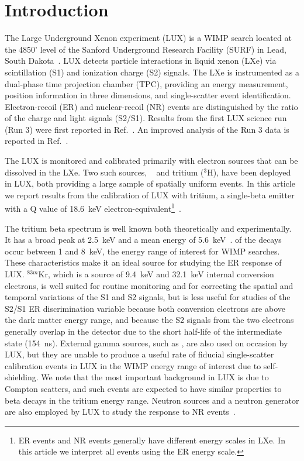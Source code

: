 \section{Introduction}

The Large Underground Xenon experiment (LUX) is a WIMP search located at the 4850' level of the Sanford Underground Research Facility (SURF) in Lead, South Dakota~\cite{lux-nim}. LUX detects particle interactions in liquid xenon (LXe) via scintillation (S1) and ionization charge (S2) signals. The LXe is instrumented as a dual-phase time projection chamber (TPC), providing an energy measurement, position information in three dimensions, and single-scatter event identification. Electron-recoil (ER) and nuclear-recoil (NR) events are distinguished by the ratio of the charge and light signals (S2/S1). Results from the first LUX science run (Run 3) were first reported in Ref.~\cite{lux-prl}. An improved analysis of the Run 3 data is reported in Ref.~\cite{lux-reanalysis}.

The LUX is monitored and calibrated primarily with electron sources that can be dissolved in the LXe. Two such sources,  \krsrc~\cite{Kastens:2009rt, Baudis} and tritium ($^{3}$H), have been deployed in LUX, both providing a large sample of spatially uniform events. In this article we report results from the calibration of LUX with tritium, a single-beta emitter with a Q value of 18.6~keV electron-equivalent\footnote{ER events and NR events generally have different energy scales in LXe. In this article we interpret all events using the ER energy scale.}~\cite{Tritium_Q}. 

The tritium beta spectrum is well known both theoretically and experimentally. It has a broad peak at 2.5~keV and a mean energy of 5.6~keV~\cite{Tritium_Mean,Tritium_Eq}.  of the decays occur between 1 and 8~keV, the energy range of interest for WIMP searches. These characteristics make it an ideal source for studying the ER response of LUX.  $^{83m}$Kr, which is a source of 9.4~keV and 32.1~keV internal conversion electrons, is well suited for routine monitoring and for correcting the spatial and temporal variations of the S1 and S2 signals, but is less useful for studies of the S2/S1 ER discrimination variable because both conversion electrons are above the dark matter energy range, and because the S2 signals from the two electrons generally overlap in the detector due to the short half-life of the intermediate state (154~ns). External gamma sources, such as \cssrc,  are also used on occasion by LUX, but they are unable to produce a useful rate of fiducial single-scatter calibration events in LUX in the WIMP energy range of interest due to self-shielding. We note that the most important background in LUX is due to Compton scatters, and such events are expected to have similar properties to beta decays in the tritium energy range. Neutron sources and a neutron generator are also employed by LUX to study the response to NR events~\cite{DD-paper}.

